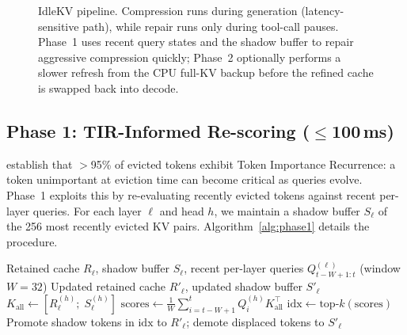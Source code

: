 \documentclass[10pt,twocolumn,letterpaper]{article}
\begin{document}
\begin{figure}[t]
{%
}
\caption{IdleKV pipeline.  Compression runs during generation
(latency-sensitive path), while repair runs only during tool-call pauses.
Phase~1 uses recent query states and the shadow buffer to repair aggressive
compression quickly; Phase~2 optionally performs a slower refresh from the
CPU full-KV backup before the refined cache is swapped back into decode.}
\label{fig:architecture}
\end{figure}

\subsection{Phase 1: TIR-Informed Re-scoring ($\leq$100\,ms)}
\label{sec:phase1}

\citet{lazyeviction2025} establish that $>$95\% of evicted tokens exhibit
Token Importance Recurrence: a token unimportant at eviction time can become
critical as queries evolve.
Phase~1 exploits this by re-evaluating recently evicted tokens against
recent per-layer queries.
For each layer $\ell$ and head $h$, we maintain a shadow buffer $S_\ell$
of the 256 most recently evicted KV pairs.
Algorithm~\ref{alg:phase1} details the procedure.

\begin{algorithm}[t]
\caption{Phase 1: TIR-Informed Token Re-scoring}
\label{alg:phase1}
\begin{algorithmic}[1]
\REQUIRE Retained cache $R_\ell$, shadow buffer $S_\ell$,
         recent per-layer queries $Q_{t-W+1:t}^{(\ell)}$ (window $W{=}32$)
\ENSURE Updated retained cache $R'_\ell$, updated shadow buffer $S'_\ell$
    \STATE $K_{\mathrm{all}} \leftarrow [R_\ell^{(h)};\; S_\ell^{(h)}]$
    \STATE $\mathrm{scores} \leftarrow \tfrac{1}{W}
           \sum_{i=t-W+1}^{t} Q_i^{(h)} K_{\mathrm{all}}^\top$
    \STATE $\mathrm{idx} \leftarrow \mathrm{top\text{-}}k(\mathrm{scores})$
    \STATE Promote shadow tokens in $\mathrm{idx}$ to $R'_\ell$;
           demote displaced tokens to $S'_\ell$
  \ENDFOR
\ENDFOR
\end{algorithmic}
\end{algorithm}
\end{document}
